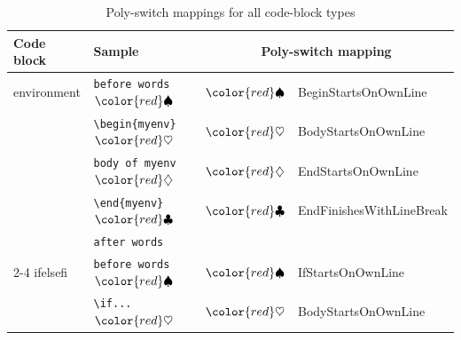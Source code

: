 \documentclass[10pt]{article}
\newcommand{\BeginStartsOnOwnLine}{\color{red}\spadesuit}
\newcommand{\BodyStartsOnOwnLine}{\color{red}\heartsuit}
\newcommand{\EndStartsOnOwnLine}{\color{red}\diamondsuit}
\newcommand{\EndFinishesWithLineBreak}{\color{red}\clubsuit}
\begin{document}
 \clearpage
 \begin{longtable}{llll}
  \caption{Poly-switch mappings for all code-block types}\label{tab:poly-switch-mapping}                                                                                                                                                   \\
  \toprule
  Code block                                             & Sample                                                            & \multicolumn{2}{c}{Poly-switch mapping}                                                                     \\
  \midrule
  environment                                            & \verb!before words!$\BeginStartsOnOwnLine$                        & $\BeginStartsOnOwnLine$                 & BeginStartsOnOwnLine                                              \\
                                                         & \verb!\begin{myenv}!$\BodyStartsOnOwnLine$                        & $\BodyStartsOnOwnLine$                  & BodyStartsOnOwnLine                                               \\
                                                         & \verb!body of myenv!$\EndStartsOnOwnLine$                         & $\EndStartsOnOwnLine$                   & EndStartsOnOwnLine                                                \\
                                                         & \verb!\end{myenv}!$\EndFinishesWithLineBreak$                     & $\EndFinishesWithLineBreak$             & EndFinishesWithLineBreak                                          \\
                                                         & \verb!after words!                                                &                                         &                                                                   \\
  \cmidrule{2-4}
  ifelsefi                                               & \verb!before words!$\BeginStartsOnOwnLine$                        & $\BeginStartsOnOwnLine$                 & IfStartsOnOwnLine                                                 \\
                                                         & \verb!\if...!$\BodyStartsOnOwnLine$                               & $\BodyStartsOnOwnLine$                  & BodyStartsOnOwnLine                                               \\

\end{longtable}
\end{document}
